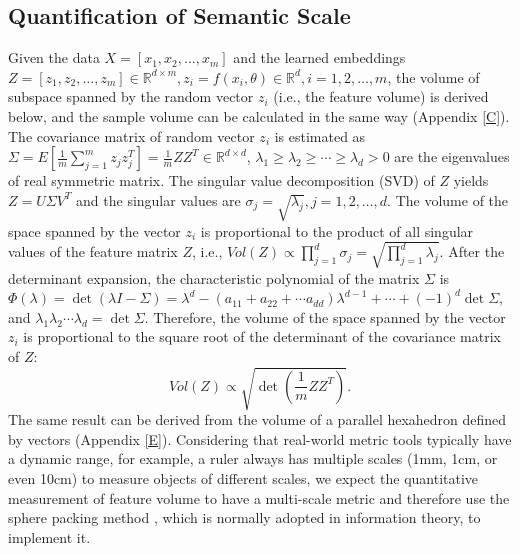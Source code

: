 \documentclass[10pt]{article} %
\begin{document}
\subsection{Quantification of Semantic Scale\label{3.2}}
Given the data $X=[ {{x_1},{x_2}, \ldots ,{x_m}} ]$ and the learned embeddings $Z = \left[ {{z_1},{z_2}, \ldots ,{z_m}} \right] \in {\mathbb{R}^{d \times m}},{z_i} = f( {{x_i},\theta } ) \in {\mathbb{R}^d},i = 1,2, \ldots ,m$, the volume of subspace spanned by the random vector ${z_i}$ (i.e., the feature volume) is derived below, and the sample volume can be calculated in the same way (Appendix \ref{C}). The covariance matrix of random vector ${z_i}$ is estimated as $ \Sigma = E\!\left[ {\frac{1}{m}\!\sum\limits_{j = 1}^m {{z_j}z_j^T} } \right] = \frac{1}{m}\!Z\!{Z^T} \in {\mathbb{R}^{d \times d}}$, ${\lambda _1} \ge {\lambda _2} \ge  \cdots  \ge {\lambda _d} > 0$ are the eigenvalues of real symmetric matrix. The singular value decomposition (SVD) of $Z$ yields $Z = U\Sigma {V^T}$ and the singular values are ${\sigma _j} = \sqrt {{\lambda _j}} ,j = 1,2, \ldots ,d$. The volume of the space spanned by the vector ${z_i}$ is proportional to the product of all singular values of the feature matrix $Z$, i.e., $V\!ol( Z ) \propto \prod\limits_{j = 1}^d {{\sigma _j}}  = \sqrt {\prod\limits_{j = 1}^d {{\lambda _j}} }$. After the determinant expansion, the characteristic polynomial of the matrix $\Sigma$ is $\Phi ( \lambda ) =  \det ( {\lambda I - \Sigma } ) ={\lambda ^d} - ({{a_{11}}+{a_{22}}+ \cdots {a_{dd}}}){\lambda ^{d - 1}} +  \cdots  + {( { - 1} )^d}\det\! \Sigma$, and ${\lambda _1}{\lambda _2} \cdots {\lambda _d} = \det\! \Sigma $. Therefore, the volume of the space spanned by the vector ${z_i}$ is proportional to the square root of the determinant of the covariance matrix of $Z$:
\begin{equation}
V\!ol( Z ) \propto \sqrt {\det ( {\frac{1}{m}\!Z\!{Z^T}} )}. 
\end{equation}The same result can be derived from the volume of a parallel hexahedron defined by vectors (Appendix \ref{E}). Considering that real-world metric tools typically have a dynamic range, for example, a ruler always has multiple scales (1mm, 1cm, or even 10cm) to measure objects of different scales, we expect the quantitative measurement of feature volume to have a multi-scale metric and therefore use the sphere packing method \cite{paper26,paper27}, which is normally adopted in information theory, to implement it.
\end{document}
